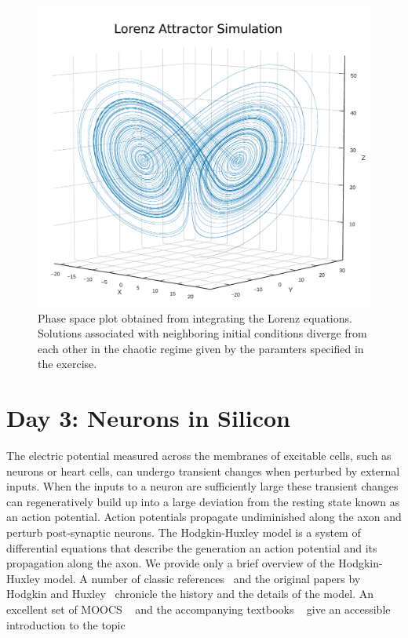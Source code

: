 \documentclass[10pt,letterpaper]{article}
\begin{document}
\begin{nolinenumbers}
\begin{figure}[H]
\begin{center}
\includegraphics[scale=0.5]{Figures/fig6_op.pdf} 
\caption{Phase space plot obtained from integrating the Lorenz equations. Solutions associated with neighboring initial conditions diverge from each other in the chaotic regime given by the paramters specified in the exercise.}
\label{fig:Lorenz}
\end{center}

\end{figure}

\section*{Day 3: Neurons in Silicon}
The electric potential measured across the membranes of excitable cells, such as neurons or heart cells, can undergo transient changes when perturbed by external inputs. When the inputs to a neuron are sufficiently large these transient changes can regeneratively build up into a large deviation from the resting state known as an action potential. Action potentials propagate undiminished along the axon and perturb post-synaptic neurons. The Hodgkin-Huxley model is a system of differential equations that describe the generation an action potential and its propagation along the axon. We provide only a brief overview of the Hodgkin-Huxley model. A number of classic references~\cite{Dayan2005, Johnston1995} and the original papers by Hodgkin and Huxley~\cite{Huxley1952} chronicle the history and the details of the model. An excellent set of MOOCS ~\cite{gerstnerMOOC, compneuroMOOC} and the accompanying textbooks ~\cite{Gerstner2014,Dayan2005} give an accessible introduction to the topic


\end{nolinenumbers}
\end{document}

